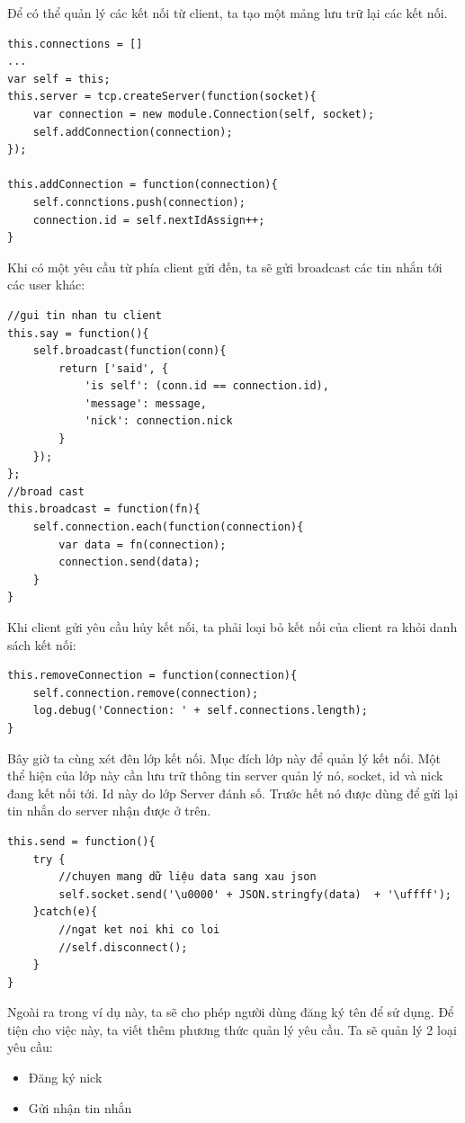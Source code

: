 	Để có thể quản lý các kết nối từ client, ta tạo một mảng lưu trữ lại các kết nối.\\
	\begin{verbatim}
this.connections = []
...
var self = this;
this.server = tcp.createServer(function(socket){
	var connection = new module.Connection(self, socket);
	self.addConnection(connection);
});
	
this.addConnection = function(connection){
	self.connctions.push(connection);
	connection.id = self.nextIdAssign++;
}
	\end{verbatim}
	
	Khi có một yêu cầu từ phía client gửi đến, ta sẽ gửi broadcast các tin nhắn tới các user khác:\\
	\begin{verbatim}
//gui tin nhan tu client
this.say = function(){
	self.broadcast(function(conn){
		return ['said', {
			'is self': (conn.id == connection.id),
			'message': message,
			'nick': connection.nick
		}
	});
};
//broad cast
this.broadcast = function(fn){
	self.connection.each(function(connection){
		var data = fn(connection);
		connection.send(data);
	}
}
	\end{verbatim}
	
Khi client gửi yêu cầu hủy kết nối, ta phải loại bỏ kết nối của client ra khỏi danh sách kết nối:\\
	\begin{verbatim}
this.removeConnection = function(connection){
	self.connection.remove(connection);
	log.debug('Connection: ' + self.connections.length);
}
	\end{verbatim}
	
Bây giờ ta cùng xét đên lớp kết nối. Mục đích lớp này để quản lý kết nối. Một thể hiện của lớp này cần lưu trữ thông tin server quản lý nó, socket, id và nick đang kết nối tới. Id này do lớp Server đánh số. Trước hết nó được dùng để gửi lại tin nhắn do server nhận được ở trên.\\
	\begin{verbatim}
this.send = function(){
	try {
		//chuyen mang dữ liệu data sang xau json
		self.socket.send('\u0000' + JSON.stringfy(data)  + '\uffff');
	}catch(e){
		//ngat ket noi khi co loi
		//self.disconnect();
	}
}
	\end{verbatim}

	Ngoài ra trong ví dụ này, ta sẽ cho phép người dùng đăng ký tên để sử dụng. Để tiện cho việc này, ta viết thêm phương thức quản lý yêu cầu. Ta sẽ quản lý 2 loại yêu cầu:
	\begin{itemize}
		\item Đăng ký nick
		\item Gửi nhận tin nhắn
	\end{itemize}
	
